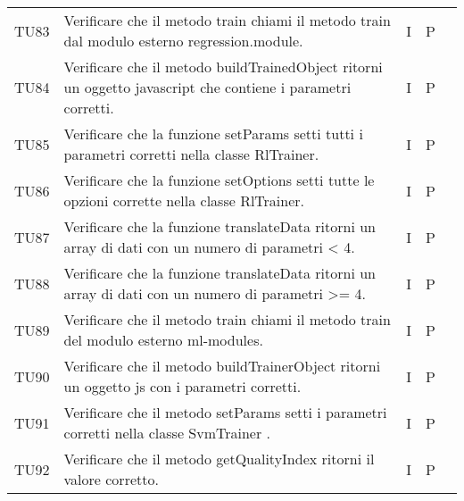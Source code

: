 \begin{longtable} {
		>{}p{15mm} 
		>{}p{79.5mm}
		>{}p{15mm} 
		>{}p{15mm}
		>{}p{0mm}}
	TU83		& Verificare che il metodo train chiami il metodo train dal modulo esterno regression.module.& I & P &\TBstrut \\ [2mm]
	TU84		& Verificare che il metodo buildTrainedObject ritorni un oggetto javascript che contiene i parametri corretti.& I & P &\TBstrut \\ [2mm]
	TU85		& Verificare che la funzione setParams setti tutti i parametri corretti nella classe RlTrainer.& I & P &\TBstrut \\ [2mm]
	TU86		& Verificare che la funzione setOptions setti tutte le opzioni corrette nella classe RlTrainer.& I & P &\TBstrut \\ [2mm]
	TU87		& Verificare che la funzione translateData ritorni un array di dati con un numero di parametri < 4.& I & P &\TBstrut \\ [2mm]
	TU88		& Verificare che la funzione translateData ritorni un array di dati con un numero di parametri >= 4.& I & P &\TBstrut \\ [2mm]
	TU89		& Verificare che il metodo train chiami il metodo train del modulo esterno ml-modules.& I & P &\TBstrut \\ [2mm]
	TU90		& Verificare che il metodo buildTrainerObject ritorni un oggetto js con i parametri corretti.& I & P &\TBstrut \\ [2mm]
	TU91		& Verificare che il metodo setParams setti i parametri corretti nella classe SvmTrainer .& I & P &\TBstrut \\ [2mm]
	TU92		& Verificare che il metodo getQualityIndex ritorni il valore corretto.& I & P &\TBstrut \\ [2mm]
	


\end{longtable}
